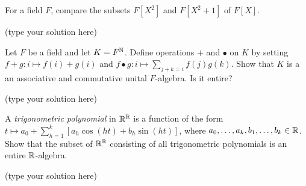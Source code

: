 \begin{ProbBox} %
\begin{problem}[Golan 142]
For a field $F$, compare the subsets $F[X^2]$ and $F[X^2+1]$ of $F[X]$.
\end{problem}
\smallskip
\begin{solution}
(type your solution here)
\end{solution}
\end{ProbBox}
\probskip

\begin{ProbBox} %
\begin{problem}[Golan 154]
Let $F$ be a field and let $K = F^{\mathbb{N}}$.  Define operations $+$ and $\bullet$ on
$K$ by setting $f+g : i \mapsto f(i) + g(i)$ and 
$f \bullet g: i \mapsto \sum_{j+k=i}f(j) g(k)$.  
Show that $K$ is a an associative and commutative unital $F$-algebra.  Is it
entire? 
\end{problem}
\smallskip
\begin{solution}
(type your solution here)
\end{solution}
\end{ProbBox}
\probskip

\begin{ProbBox} %
\begin{problem}[Golan 157]
A \emph{trigonometric polynomial} in $\mathbb{R}^{\mathbb{R}}$ is a function of the form 
$t \mapsto a_0 + \sum_{h=1}^k [a_h \cos(ht) + b_h \sin(ht)]$, where
$a_0, \dots, a_k, b_1, \dots, b_k \in \mathbb{R}$.  Show that the subset of $\mathbb{R}^{\mathbb{R}}$
consisting of all trigonometric polynomials is an entire $\mathbb{R}$-algebra.
\end{problem}
\smallskip
\begin{solution}
(type your solution here)
\end{solution}
\end{ProbBox}
\probskip


